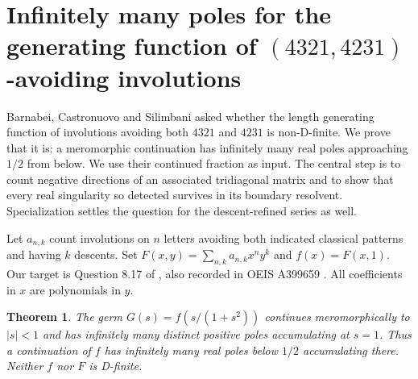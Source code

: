 \documentclass[11pt,a4paper]{article}
\numberwithin{equation}{section}
\newtheorem{theorem}{Theorem}[section]
\theoremstyle{definition}
\theoremstyle{remark}
\newenvironment{sectionabstract}{\par\smallskip\begingroup\small\noindent}{\par\endgroup\medskip}
\begin{document}
\par\endgroup

\begingroup
\newcommand{\D}{\mathbb D}
\newcommand{\N}{\mathbb N}
\section{\texorpdfstring{Infinitely many poles for the generating function of $(4321,4231)$-avoiding involutions}{Infinitely many poles for the generating function of (4321,4231)-avoiding involutions}}\label{section:r41taisho}
\par\medskip


\begin{sectionabstract}
Barnabei, Castronuovo and Silimbani asked whether the length generating
function of involutions avoiding both $4321$ and $4231$ is non-D-finite.
We prove that it is: a meromorphic continuation has infinitely many real
poles approaching $1/2$ from below. We use their continued fraction as
input. The central step is to count negative directions of an associated
tridiagonal matrix and to show that every real singularity so detected
survives in its boundary resolvent. Specialization settles the question
for the descent-refined series as well.
\end{sectionabstract}

Let $a_{n,k}$ count involutions on $n$ letters avoiding both indicated
classical patterns and having $k$ descents. Set
$F(x,y)=\sum_{n,k}a_{n,k}x^ny^k$ and $f(x)=F(x,1)$.
Our target is Question 8.17 of \cite{r41taisho:BCS}, also recorded in OEIS
A399659 \cite{r41taisho:OEIS}. All coefficients in $x$ are polynomials in $y$.
\begin{theorem}
The germ $G(s)=f(s/(1+s^2))$ continues meromorphically to $|s|<1$
and has infinitely many distinct positive poles accumulating at $s=1$.
Thus a continuation of $f$ has infinitely many real poles below $1/2$
accumulating there. Neither $f$ nor $F$ is D-finite.
\end{theorem}
\end{document}
